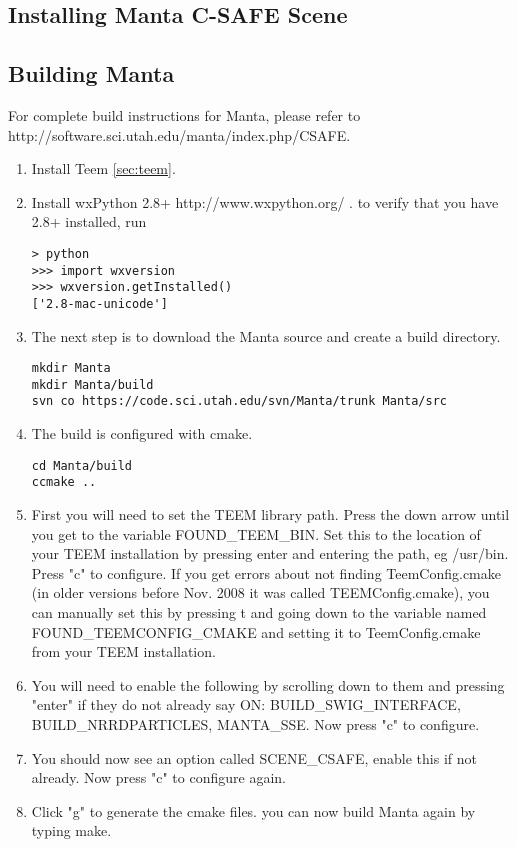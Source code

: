 \subsection{Installing Manta C-SAFE Scene}

\subsection{Building Manta}

For complete build instructions for Manta, please refer to
http://software.sci.utah.edu/manta/index.php/CSAFE.  

\begin{enumerate}
\item
Install Teem \ref{sec:teem}.
\item
Install wxPython 2.8+ http://www.wxpython.org/ .  
to verify that you have 2.8+ installed, run
\begin{Verbatim}
> python
>>> import wxversion
>>> wxversion.getInstalled()
['2.8-mac-unicode']
\end{Verbatim}
\item
The next step is to download the Manta source and create a build directory.
\begin{Verbatim}
mkdir Manta
mkdir Manta/build
svn co https://code.sci.utah.edu/svn/Manta/trunk Manta/src
\end{Verbatim}
\item
The build is configured with cmake.
\begin{Verbatim}
cd Manta/build
ccmake ..
\end{Verbatim}
\item
 First you will need to set the TEEM library path. Press the down arrow until you get to the variable FOUND\_TEEM\_BIN. Set this to the location of your TEEM installation by pressing enter and entering the path, eg /usr/bin. Press "c" to configure. If you get errors about not finding TeemConfig.cmake (in older versions before Nov. 2008 it was called TEEMConfig.cmake), you can manually set this by pressing t and going down to the variable named FOUND\_TEEMCONFIG\_CMAKE and setting it to TeemConfig.cmake from your TEEM installation. 
 \item
 You will need to enable the following by scrolling down to them and pressing "enter" if they do not already say ON: BUILD\_SWIG\_INTERFACE, BUILD\_NRRDPARTICLES, MANTA\_SSE. Now press "c" to configure. 
 \item
 You should now see an option called SCENE\_CSAFE, enable this if not already. Now press "c" to configure again. 
 \item
 Click "g" to generate the cmake files. you can now build Manta again by typing make. 
\end{enumerate}

